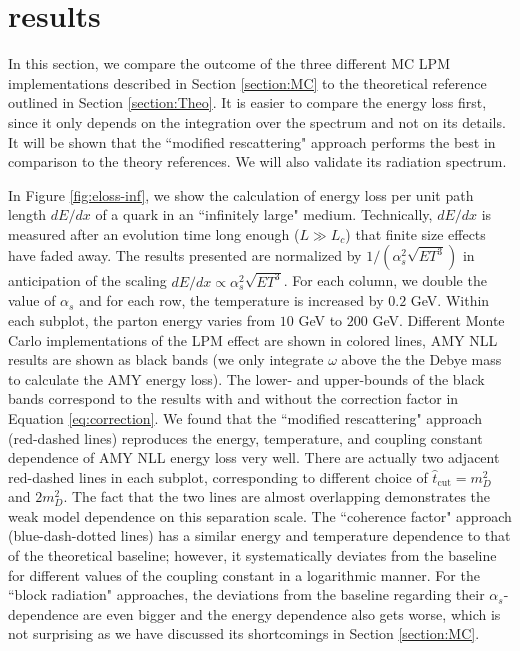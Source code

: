 \documentclass[aps, prc, reprint, amsmath, groupedaddress, nofootinbib]{revtex4-1}
\begin{document}
\section{results}\label{section:results}
In this section, we compare the outcome of the three different MC LPM implementations described in Section \ref{section:MC} to the theoretical reference outlined in Section \ref{section:Theo}. 
It is easier to compare the energy loss first, since it only depends on the integration over the spectrum and not on its details.
It will be shown that the ``modified rescattering" approach performs the best in comparison to the theory references. 
We will also validate its radiation spectrum.


In Figure \ref{fig:eloss-inf}, we show the calculation of energy loss per unit path length $dE/dx$ of a quark in an ``infinitely large" medium. 
Technically, $dE/dx$ is measured after an evolution time long enough ($L\gg L_c$) that finite size effects have faded away.
The results presented are normalized by $1/(\alpha_s^2 \sqrt{ET^3})$ in anticipation of the scaling $dE/dx \propto \alpha_s^2 \sqrt{ET^3}$.
For each column, we double the value of $\alpha_s$ and for each row, the temperature is increased by $0.2$ GeV. 
Within each subplot, the parton energy varies from $10$ GeV to $200$ GeV.
Different Monte Carlo implementations of the LPM effect are shown in colored lines, AMY NLL results are shown as black bands (we only integrate $\omega$ above the the Debye mass to calculate the AMY energy loss). 
The lower- and upper-bounds of the black bands correspond to the results with and without the correction factor in Equation \ref{eq:correction}.
We found that the ``modified rescattering" approach (red-dashed lines) reproduces the energy, temperature, and coupling constant dependence of AMY NLL energy loss very well.
There are actually two adjacent red-dashed lines in each subplot, corresponding to different choice of $\hat{t}_{\textrm{cut}}=m_D^2$ and $2 m_D^2$. 
The fact that the two lines are almost overlapping demonstrates the weak model dependence on this separation scale.
The ``coherence factor" approach (blue-dash-dotted lines) has a similar energy and temperature dependence to that of the theoretical baseline; however, it systematically deviates from the baseline for different values of the coupling constant in a logarithmic manner.
For the ``block radiation" approaches, the deviations from the baseline regarding their $\alpha_s$-dependence are even bigger and the energy dependence also gets worse, which is not surprising as we have discussed its shortcomings in Section \ref{section:MC}.
\end{document}
